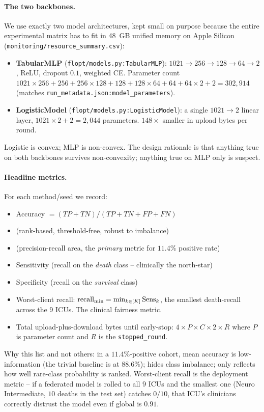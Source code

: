 \paragraph{The two backbones.} We use exactly two model architectures, kept
small on purpose because the entire experimental matrix has to fit in 48~GB
unified memory on Apple Silicon (\texttt{monitoring/resource\_summary.csv}):
\begin{itemize}[leftmargin=*,topsep=2pt]
    \item \textbf{TabularMLP} (\texttt{flopt/models.py:TabularMLP}): $1021 \!\to\! 256
        \!\to\! 128 \!\to\! 64 \!\to\! 2$, ReLU, dropout $0.1$, weighted CE.
        Parameter count
        $1021\!\times\!256 + 256 + 256\!\times\!128 + 128 + 128\!\times\!64 + 64 + 64\!\times\!2 + 2 = 302{,}914$
        (matches \texttt{run\_metadata.json:model\_parameters}).
    \item \textbf{LogisticModel} (\texttt{flopt/models.py:LogisticModel}): a single
        $1021 \!\to\! 2$ linear layer, $1021\!\times\!2 + 2 = 2{,}044$
        parameters. $148\!\times$ smaller in upload bytes per round.
\end{itemize}
Logistic is convex; MLP is non-convex. The design rationale is that anything
true on both backbones survives non-convexity; anything true on MLP only is
suspect.

\paragraph{Headline metrics.} For each method/seed we record:
\begin{itemize}[leftmargin=*,nosep]
    \item Accuracy $= (TP + TN) / (TP + TN + FP + FN)$
    \item \auroc{} (rank-based, threshold-free, robust to imbalance)
    \item \auprc{} (precision-recall area, the \emph{primary} metric for $11.4\%$
        positive rate)
    \item Sensitivity (recall on the \emph{death} class -- clinically the
        north-star)
    \item Specificity (recall on the \emph{survival} class)
    \item Worst-client recall: $\text{recall}_{\min}{} = \min_{k\in[K]} \text{Sens}_k$, the
        smallest death-recall across the 9 ICUs. The clinical fairness metric.
    \item Total upload-plus-download bytes until early-stop: $4 \times P \times C
        \times 2 \times R$ where $P$ is parameter count and $R$ is the
        \texttt{stopped\_round}.
\end{itemize}
Why this list and not others: in a $11.4\%$-positive cohort, mean accuracy is
low-information (the trivial baseline is at $88.6\%$); \auroc{} hides class
imbalance; only \auprc{} reflects how well rare-class probability is ranked.
Worst-client recall is the deployment metric -- if a federated model is rolled
to all $9$ ICUs and the smallest one (Neuro Intermediate, $10$ deaths in the
test set) catches $0/10$, that ICU's clinicians correctly distrust the model
even if global \auroc{} is $0.91$.

